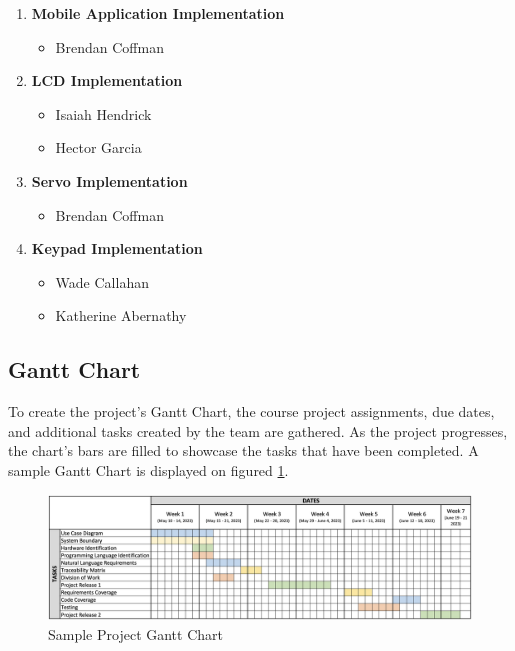 \begin{enumerate}
    \item \textbf{Mobile Application Implementation}
    \begin{itemize}
        \item Brendan Coffman 
    \end{itemize}

    \item \textbf{LCD Implementation}
    \begin{itemize}
        \item Isaiah Hendrick
        \item Hector Garcia
    \end{itemize}

    \item \textbf{Servo Implementation}
    \begin{itemize}
        \item Brendan Coffman 
    \end{itemize}

    \item \textbf{Keypad Implementation}
    \begin{itemize}
        \item Wade Callahan
        \item Katherine Abernathy
    \end{itemize}

\end{enumerate}

\subsection{Gantt Chart}
To create the project's Gantt Chart, the course project assignments, due dates, and additional tasks created by the team are gathered. As the project progresses, the chart's bars are filled to showcase the tasks that have been completed. A sample Gantt Chart is displayed on figured \ref{fig:Gantt Chart}.

\begin{figure}[htb]
    \begin{center}
        \includegraphics[width = \textwidth]{Images/CIS 350 - Project - Gantt Chart .png}
        \caption{Sample Project Gantt Chart}
        \label{fig:Gantt Chart}
    \end{center}
\end{figure}
